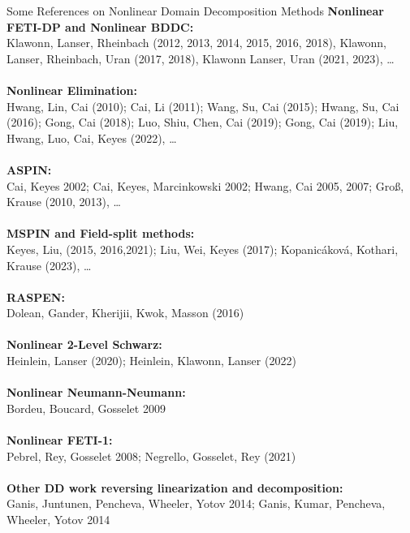 \begin{frame}{Some References on Nonlinear Domain Decomposition Methods}
	\tiny
	\textbf{Nonlinear FETI-DP and Nonlinear BDDC:}\\
	Klawonn, Lanser, Rheinbach (2012, 2013, 2014, 2015, 2016, 2018), Klawonn, Lanser, Rheinbach, Uran (2017, 2018), Klawonn Lanser, Uran (2021, 2023), \dots\\~\\

	\textbf{Nonlinear Elimination:}\\
	Hwang, Lin, Cai (2010); Cai, Li (2011); Wang, Su, Cai (2015); Hwang, Su, Cai (2016); Gong, Cai (2018); Luo, Shiu, Chen, Cai (2019); Gong, Cai (2019); Liu, Hwang, Luo, Cai, Keyes (2022), \dots\\~\\

	\textbf{ASPIN:}\\
	Cai, Keyes 2002; Cai, Keyes, Marcinkowski 2002; Hwang, Cai 2005, 2007; Groß, Krause (2010, 2013), \dots\\~\\

	\textbf{MSPIN and Field-split methods:}\\
	Keyes, Liu, (2015, 2016,2021); Liu, Wei, Keyes (2017); Kopanicáková, Kothari, Krause (2023), \dots\\~\\

	\textbf{RASPEN:}\\
	Dolean, Gander, Kherijii, Kwok, Masson (2016)\\~\\

	\textbf{Nonlinear 2-Level Schwarz:}\\
	Heinlein, Lanser (2020); Heinlein, Klawonn, Lanser (2022)\\~\\

	\textbf{Nonlinear Neumann-Neumann:}\\ Bordeu, Boucard, Gosselet 2009\\~\\

	\textbf{Nonlinear FETI-1:}\\
	Pebrel, Rey, Gosselet 2008; Negrello, Gosselet, Rey (2021)\\~\\

	\textbf{Other DD work reversing linearization and decomposition:}\\
	Ganis, Juntunen, Pencheva, Wheeler, Yotov 2014; Ganis, Kumar, Pencheva, Wheeler, Yotov 2014
\end{frame}

